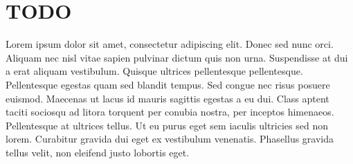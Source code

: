
\chapter{TODO}
\label{cha:todo}
Lorem ipsum dolor sit amet, consectetur adipiscing elit. Donec sed nunc orci. Aliquam nec nisl vitae sapien pulvinar dictum quis non urna. Suspendisse at dui a erat aliquam vestibulum. Quisque ultrices pellentesque pellentesque. Pellentesque egestas quam sed blandit tempus. Sed congue nec risus posuere euismod. Maecenas ut lacus id mauris sagittis egestas a eu dui. Class aptent taciti sociosqu ad litora torquent per conubia nostra, per inceptos himenaeos. Pellentesque at ultrices tellus. Ut eu purus eget sem iaculis ultricies sed non lorem. Curabitur gravida dui eget ex vestibulum venenatis. Phasellus gravida tellus velit, non eleifend justo lobortis eget.
